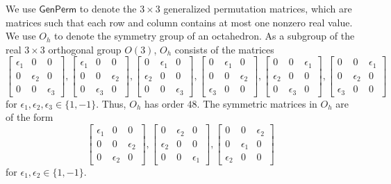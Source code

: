 \documentclass[11pt]{article}
\newcommand{\genperm}{\textsf{GenPerm}\xspace}
\newcommand{\octgroup}{O_h}
\begin{document}
We use $\genperm$ to denote the $3 \times 3$ generalized permutation matrices, which are matrices such that each row and column contains at most one nonzero real value.
We use $\octgroup$ to denote the symmetry group of an octahedron.
As a subgroup of the real $3 \times 3$ orthogonal group $O(3)$, $\octgroup$ consists of the matrices
\[
\begin{bmatrix}
    \epsilon_1 & 0 & 0 \\
    0 & \epsilon_2 & 0 \\
    0 & 0 & \epsilon_3
\end{bmatrix},
\begin{bmatrix}
    \epsilon_1 & 0 & 0 \\
    0 & 0 & \epsilon_2 \\
    0 & \epsilon_3 & 0
\end{bmatrix},
\begin{bmatrix}
    0 & \epsilon_1 & 0 \\
    \epsilon_2 & 0 & 0 \\
    0 & 0 & \epsilon_3
\end{bmatrix},
\begin{bmatrix}
    0 & \epsilon_1 & 0 \\
    0 & 0 & \epsilon_2 \\
    \epsilon_3 & 0 & 0 
\end{bmatrix},
\begin{bmatrix}
    0 & 0 & \epsilon_1 \\
    \epsilon_2 & 0 & 0 \\
    0 & \epsilon_3 & 0
\end{bmatrix},
\begin{bmatrix}
    0 & 0 & \epsilon_1 \\
    0 &  \epsilon_2 & 0\\
     \epsilon_3 & 0 & 0
\end{bmatrix}
\]
for $\epsilon_1, \epsilon_2, \epsilon_3 \in \{1, -1\}$.
Thus, $\octgroup$ has order $48$.
The symmetric matrices in $\octgroup$ are of the form 
\[
  \begin{bmatrix}
      \epsilon_1 & 0 & 0 \\
      0 & 0 & \epsilon_2 \\
      0 & \epsilon_2 & 0
      \end{bmatrix}, 
       \begin{bmatrix}
      0 & \epsilon_2 & 0 \\
      \epsilon_2 & 0 & 0 \\
      0 & 0 & \epsilon_1
      \end{bmatrix}, 
       \begin{bmatrix}
      0 & 0 & \epsilon_2 \\
      0 & \epsilon_1 & 0 \\
      \epsilon_2 & 0 & 0
  \end{bmatrix} 
\]
for $\epsilon_1, \epsilon_2 \in \{1, -1\}$.
\end{document}
